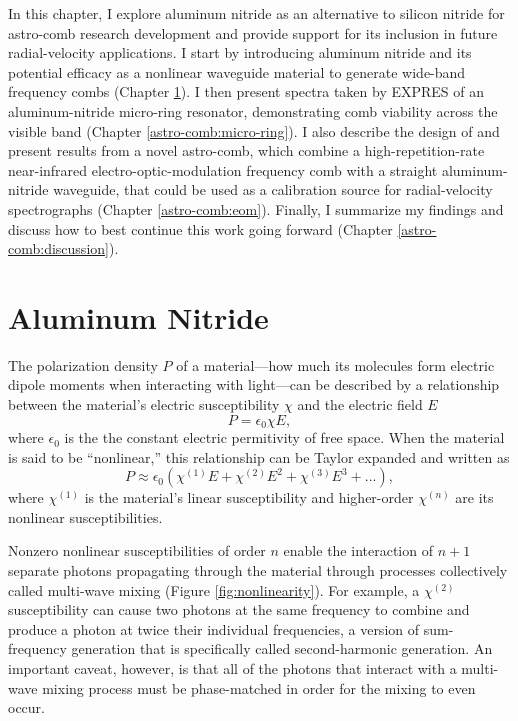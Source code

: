 In this chapter, I explore aluminum nitride as an alternative to silicon nitride for astro-comb research development and provide support for its inclusion in future radial-velocity applications. I start by introducing aluminum nitride and its potential efficacy as a nonlinear waveguide material to generate wide-band frequency combs (Chapter \ref{astro-comb:aln}). I then present spectra taken by EXPRES of an aluminum-nitride micro-ring resonator, demonstrating comb viability across the visible band (Chapter \ref{astro-comb:micro-ring}). I also describe the design of and present results from a novel astro-comb, which combine a high-repetition-rate near-infrared electro-optic-modulation frequency comb with a straight aluminum-nitride waveguide, that could be used as a calibration source for radial-velocity spectrographs (Chapter \ref{astro-comb:eom}). Finally, I summarize my findings and discuss how to best continue this work going forward (Chapter \ref{astro-comb:discussion}).

\section{Aluminum Nitride} \label{astro-comb:aln}

The polarization density $P$ of a material---how much its molecules form electric dipole moments when interacting with light---can be described by a relationship between the material's electric susceptibility $\chi$ and the electric field $E$
\begin{equation}
    P=\epsilon_0 \chi E,
\end{equation}
where $\epsilon_0$ is the the constant electric permitivity of free space. When the material is said to be ``nonlinear,'' this relationship can be Taylor expanded and written as
\begin{equation}
    P \approx \epsilon_0 \left( \chi^{(1)} E + \chi^{(2)} E^2 + \chi^{(3)} E^3 + ... \right),
    \label{eq:polarizability}
\end{equation}
where $\chi^{(1)}$ is the material's linear susceptibility and higher-order $\chi^{(n)}$ are its nonlinear susceptibilities. 

Nonzero nonlinear susceptibilities of order $n$ enable the interaction of $n+1$ separate photons propagating through the material through processes collectively called multi-wave mixing (Figure \ref{fig:nonlinearity}). For example, a $\chi^{(2)}$ susceptibility can cause two photons at the same frequency to combine and produce a photon at twice their individual frequencies, a version of sum-frequency generation that is specifically called second-harmonic generation. An important caveat, however, is that all of the photons that interact with a multi-wave mixing process must be phase-matched in order for the mixing to even occur.

